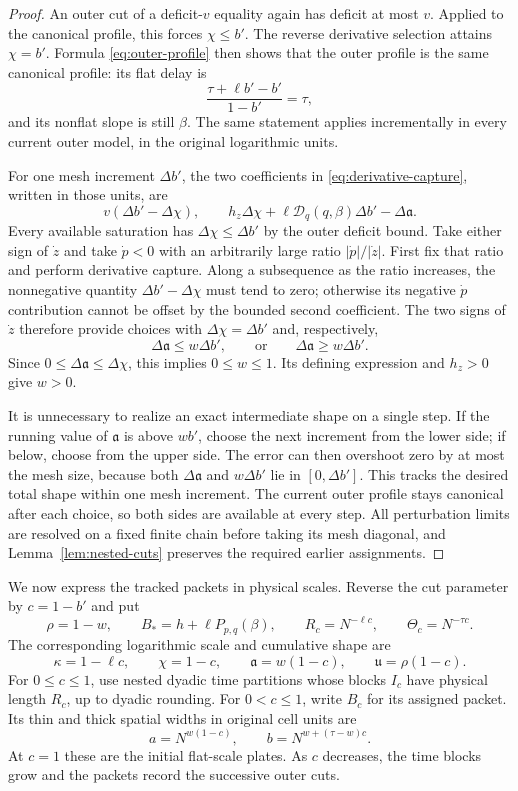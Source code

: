 \begin{proof}
An outer cut of a deficit-$v$ equality again has deficit at most $v$.
Applied to the canonical profile, this forces $\chi\le b'$. The reverse
derivative selection attains $\chi=b'$. Formula
\eqref{eq:outer-profile} then shows that the outer profile is the same
canonical profile: its flat delay is
\[
 \frac{\tau+\ell b'-b'}{1-b'}=\tau,
\]
and its nonflat slope is still $\beta$. The same statement applies
incrementally in every current outer model, in the original logarithmic
units.

For one mesh increment $\Delta b'$, the two coefficients in
\eqref{eq:derivative-capture}, written in those units, are
\[
 v(\Delta b'-\Delta\chi),\qquad
 h_z\Delta\chi+\ell\mathcal D_q(q,\beta)\Delta b'
                  -\Delta\mathfrak a.
\]
Every available saturation has $\Delta\chi\le\Delta b'$ by the outer
deficit bound. Take either sign of $\dot z$ and take $\dot p<0$ with
an arbitrarily large ratio $|\dot p|/|\dot z|$. First fix that ratio and
perform derivative capture. Along a subsequence as the ratio increases,
the nonnegative quantity $\Delta b'-\Delta\chi$ must tend to zero;
otherwise its negative $\dot p$ contribution cannot be offset by the
bounded second coefficient. The two signs of $\dot z$ therefore provide
choices with $\Delta\chi=\Delta b'$ and, respectively,
\[
 \Delta\mathfrak a\le w\Delta b',
 \qquad\text{or}\qquad
 \Delta\mathfrak a\ge w\Delta b'.
\]
Since $0\le\Delta\mathfrak a\le\Delta\chi$, this implies
$0\le w\le1$. Its defining expression and $h_z>0$ give $w>0$.

It is unnecessary to realize an exact intermediate shape on a single
step. If the running value of $\mathfrak a$ is above $wb'$, choose the
next increment from the lower side; if below, choose from the upper
side. The error can then overshoot zero by at most the mesh size, because
both $\Delta\mathfrak a$ and $w\Delta b'$ lie in
$[0,\Delta b']$. This tracks the desired total shape within one mesh
increment. The current outer profile stays canonical after each choice,
so both sides are available at every step. All perturbation limits are
resolved on a fixed finite chain before taking its mesh diagonal, and
Lemma~\ref{lem:nested-cuts} preserves the required earlier assignments.
\end{proof}

We now express the tracked packets in physical scales. Reverse the cut
parameter by $c=1-b'$ and put
\[
 \rho=1-w,\qquad B_*=h+\ell P_{p,q}(\beta),\qquad
 R_c=N^{-\ell c},\qquad\Theta_c=N^{-\tau c}.
\]
The corresponding logarithmic scale and cumulative shape are
\[
 \kappa=1-\ell c,\qquad \chi=1-c,\qquad
 \mathfrak a=w(1-c),\qquad \mathfrak u=\rho(1-c).
\]
For $0\le c\le1$, use nested dyadic time partitions whose blocks $I_c$
have physical length $R_c$, up to dyadic rounding. For
$0<c\le1$, write $B_c$ for its assigned packet. Its thin and thick
spatial widths in original cell units are
\begin{equation}
 a=N^{w(1-c)},\qquad
 b=N^{w+(\tau-w)c}.
 \label{eq:stationary-spatial-widths}
\end{equation}
At $c=1$ these are the initial flat-scale plates. As $c$ decreases,
the time blocks grow and the packets record the successive outer cuts.

